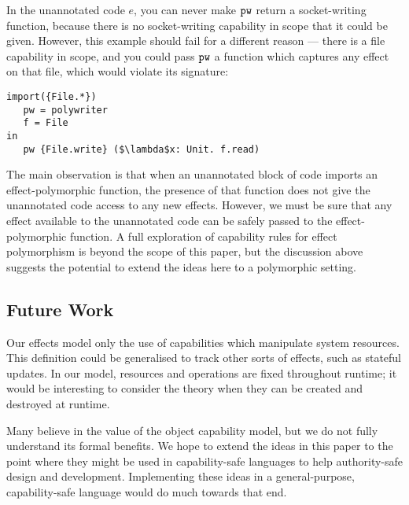 In the unannotated code $e$, you can never make $\mathtt{pw}$ return a socket-writing function, because there is no socket-writing capability in scope that it could be given. However, this example should fail for a different reason --- there is a file capability in scope, and you could pass $\mathtt{pw}$ a function which captures any effect on that file, which would violate its signature:

\begin{lstlisting}
import({File.*}) 
   pw = polywriter
   f = File
in
   pw {File.write} ($\lambda$x: Unit. f.read)
\end{lstlisting}

The main observation is that when an unannotated block of code imports an effect-polymorphic function, the presence of that function does not give the unannotated code access to any new effects.  However, we must be sure that any effect available to the unannotated code can be safely passed to the effect-polymorphic function.  A full exploration of capability rules for effect polymorphism is beyond the scope of this paper, but the discussion above suggests the potential to extend the ideas here to a polymorphic setting.



\subsection{Future Work}

Our effects model only the use of capabilities which manipulate system resources. This definition could be generalised to track other sorts of effects, such as stateful updates. In our model, resources and operations are fixed throughout runtime; it would be interesting to consider the theory when they can be created and destroyed at runtime.

Many believe in the value of the object capability model, but we do not fully understand its formal benefits. We hope to extend the ideas in this paper to the point where they might be used in capability-safe languages to help authority-safe design and development. Implementing these ideas in a general-purpose, capability-safe language would do much towards that end.

